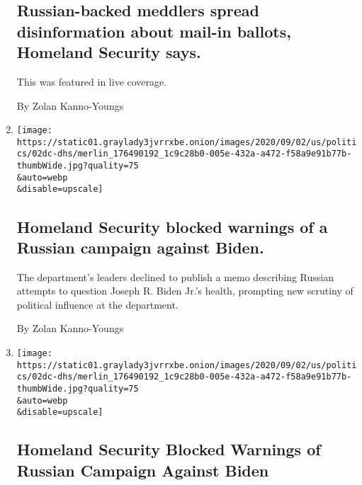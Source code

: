 \begin{enumerate}
  \hypertarget{russian-backed-meddlers-spread-disinformation-about-mail-in-ballots-homeland-security-says}{%
  \subsection{Russian-backed meddlers spread disinformation about
  mail-in ballots, Homeland Security
  says.}\label{russian-backed-meddlers-spread-disinformation-about-mail-in-ballots-homeland-security-says}}

  This was featured in live coverage.

  By Zolan Kanno-Youngs
\item
  \href{/2020/09/03/us/elections/homeland-security-blocked-warnings-of-a-russian-campaign-against-biden.html}{}

  \texttt{[image: https://static01.graylady3jvrrxbe.onion/images/2020/09/02/us/politics/02dc-dhs/merlin\_176490192\_1c9c28b0-005e-432a-a472-f58a9e91b77b-thumbWide.jpg?quality=75\\\&auto=webp\\\&disable=upscale]}

  \hypertarget{homeland-security-blocked-warnings-of-a-russian-campaign-against-biden}{%
  \subsection{Homeland Security blocked warnings of a Russian campaign
  against
  Biden.}\label{homeland-security-blocked-warnings-of-a-russian-campaign-against-biden}}

  The department's leaders declined to publish a memo describing Russian
  attempts to question Joseph R. Biden Jr.'s health, prompting new
  scrutiny of political influence at the department.

  By Zolan Kanno-Youngs
\item
  \href{/2020/09/02/us/politics/trump-biden-russia-election.html}{}

  \texttt{[image: https://static01.graylady3jvrrxbe.onion/images/2020/09/02/us/politics/02dc-dhs/merlin\_176490192\_1c9c28b0-005e-432a-a472-f58a9e91b77b-thumbWide.jpg?quality=75\\\&auto=webp\\\&disable=upscale]}

  \hypertarget{homeland-security-blocked-warnings-of-russian-campaign-against-biden}{%
  \subsection{Homeland Security Blocked Warnings of Russian Campaign
  Against
  Biden}\label{homeland-security-blocked-warnings-of-russian-campaign-against-biden}}


\end{enumerate}
